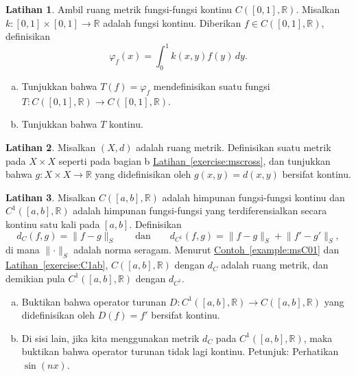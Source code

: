 \documentclass[12pt,openany]{book}
\newcommand{\snorm}[1]{\lVert {#1} \rVert}
\newcommand{\R}{{\mathbb{R}}}
\theoremstyle{plain}
\theoremstyle{remark}
\theoremstyle{definition}
\newenvironment{exbox}{%
    \def\FrameCommand{\vrule width 1pt \relax\hspace{10pt}}%
    \MakeFramed{\advance\hsize-\width\FrameRestore}%
}{%
    \endMakeFramed
}
\newenvironment{exparts}{%
    \leavevmode\begin{enumerate}[a),noitemsep,topsep=0pt,parsep=0pt,partopsep=0pt]
}{%
    \end{enumerate}
}
\theoremstyle{exercise}
\newtheorem{exercise}{Latihan}[section]
\theoremstyle{example}
\newcommand{\exerciseref}[1]{\hyperref[#1]{Latihan~\ref*{#1}}}
\newcommand{\exampleref}[1]{\hyperref[#1]{Contoh~\ref*{#1}}}
\begin{document}
\begin{exbox}
\begin{exercise} \label{exercise:continuousintoperator}
Ambil ruang metrik fungsi-fungsi kontinu $C([0,1],\R)$.  Misalkan
$k \colon [0,1] \times [0,1] \to \R$ adalah fungsi kontinu.
Diberikan $f \in C([0,1],\R)$, definisikan
\begin{equation*}
\varphi_f(x) = \int_0^1 k(x,y) f(y)  \, dy .
\end{equation*}
\begin{exparts}
\item
Tunjukkan bahwa $T(f) = \varphi_f$ mendefinisikan suatu fungsi $T \colon C([0,1],\R) \to
C([0,1],\R)$.
\item
Tunjukkan bahwa $T$ kontinu.
\end{exparts}
\end{exercise}

\begin{exercise} \label{exercise:metriccontinuous}
Misalkan $(X,d)$ adalah ruang metrik.
Definisikan suatu metrik pada $X \times X$ seperti pada bagian b
\exerciseref{exercise:mscross}, dan tunjukkan bahwa $g \colon X \times X \to \R$ yang didefinisikan oleh
$g(x,y) = d(x,y)$ bersifat kontinu.
\end{exercise}

\begin{exercise}
Misalkan $C([a,b],\R)$ adalah himpunan fungsi-fungsi kontinu dan
$C^1([a,b],\R)$ adalah himpunan fungsi-fungsi yang terdiferensialkan
secara kontinu satu kali pada $[a,b]$.
Definisikan
\begin{equation*}
d_{C}(f,g) = \snorm{f-g}_S
\qquad \text{dan} \qquad
d_{C^1}(f,g) = \snorm{f-g}_S + \snorm{f'-g'}_S,
\end{equation*}
di mana $\snorm{\cdot}_S$ adalah norma seragam.
Menurut \exampleref{example:msC01} dan \exerciseref{exercise:C1ab},
$C([a,b],\R)$ dengan $d_C$ adalah ruang metrik, dan demikian pula
$C^1([a,b],\R)$ dengan $d_{C^1}$.
\begin{exparts}
\item
Buktikan bahwa operator turunan $D \colon 
C^1([a,b],\R) \to C([a,b],\R)$ yang didefinisikan oleh
$D(f) = f'$ bersifat kontinu.
\item
Di sisi lain, jika kita menggunakan metrik $d_C$ pada $C^1([a,b],\R)$,
maka buktikan bahwa operator turunan tidak lagi kontinu.  Petunjuk: Perhatikan
$\sin(n x)$.
\end{exparts}
\end{exercise}


\end{exbox}
\end{document}
